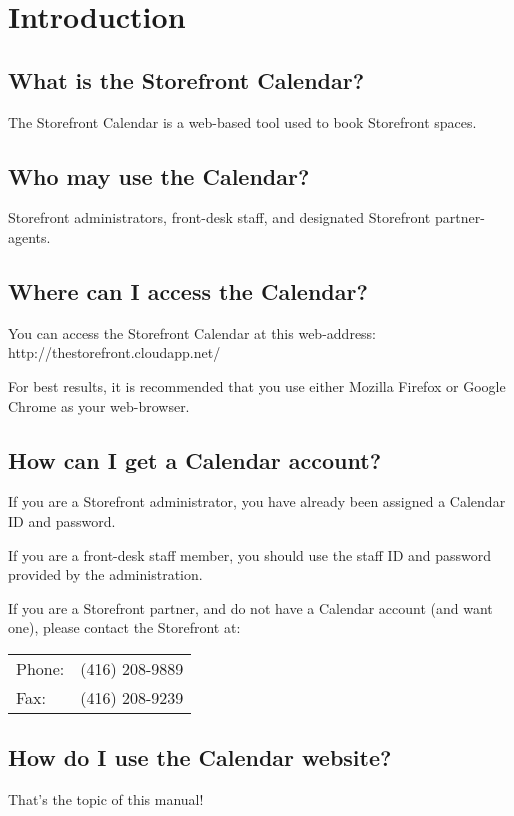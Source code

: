 \section*{Introduction}


\subsection*{What is the Storefront Calendar?}

The Storefront Calendar is a web-based tool used to book Storefront spaces.


\subsection*{Who may use the Calendar?}

Storefront administrators, front-desk staff, and designated Storefront partner-agents.


\subsection*{Where can I access the Calendar?}

You can access the Storefront Calendar at this web-address: http://thestorefront.cloudapp.net/

For best results, it is recommended that you use either Mozilla Firefox or Google Chrome as your web-browser.


\subsection*{How can I get a Calendar account?}

If you are a Storefront administrator, you have already been assigned a Calendar ID and password.

If you are a front-desk staff member, you should use the staff ID and password provided by the administration.

If you are a Storefront partner, and do not have a Calendar account (and want one), please contact the Storefront at:\newline\newline
\begin{tabular}{l l}
Phone: & (416) 208-9889 \\
Fax:   & (416) 208-9239 \\
\end{tabular}


\subsection*{How do I use the Calendar website?}

That's the topic of this manual!






